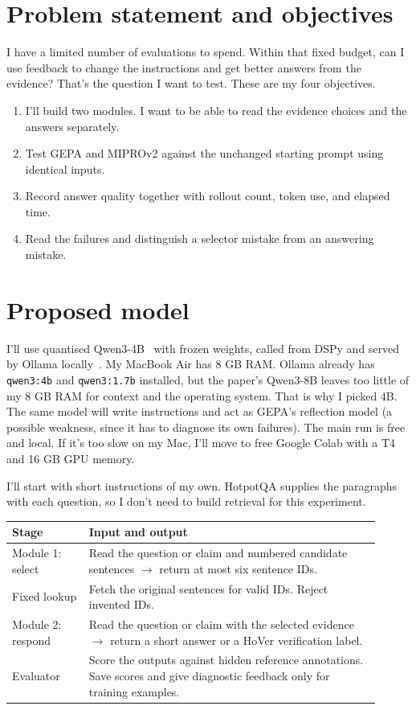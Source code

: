 \documentclass[11pt,a4paper]{article}
\begin{document}
\section{Problem statement and objectives}
I have a limited number of evaluations to spend. Within that fixed budget, can I use feedback to change the instructions and get better answers from the evidence? That's the question I want to test. These are my four objectives.
\begin{enumerate}
\setlength{\itemsep}{0pt}
\setlength{\parskip}{0pt}
\item I'll build two modules. I want to be able to read the evidence choices and the answers separately.
\item Test GEPA and MIPROv2 against the unchanged starting prompt using identical inputs.
\item Record answer quality together with rollout count, token use, and elapsed time.
\item Read the failures and distinguish a selector mistake from an answering mistake.
\end{enumerate}

\section{Proposed model}
I'll use quantised Qwen3-4B~\cite{qwen} with frozen weights, called from DSPy and served by Ollama locally~\cite{ollama}. My MacBook Air has 8 GB RAM. Ollama already has \texttt{qwen3:4b} and \texttt{qwen3:1.7b} installed, but the paper's Qwen3-8B leaves too little of my 8 GB RAM for context and the operating system. That is why I picked 4B. The same model will write instructions and act as GEPA's reflection model (a possible weakness, since it has to diagnose its own failures). The main run is free and local. If it's too slow on my Mac, I'll move to free Google Colab with a T4 and 16 GB GPU memory.

I'll start with short instructions of my own. HotpotQA supplies the paragraphs with each question, so I don't need to build retrieval for this experiment.

\begin{center}
\small
\begin{tabular}{|p{0.19\linewidth}|p{0.72\linewidth}|}
\hline
Stage & Input and output \\ \hline
Module 1: select & Read the question or claim and numbered candidate sentences
$\rightarrow$ return at most six sentence IDs. \\ \hline
Fixed lookup & Fetch the original sentences for valid IDs. Reject invented IDs. \\ \hline
Module 2: respond & Read the question or claim with the selected evidence
$\rightarrow$ return a short answer or a HoVer verification label. \\ \hline
Evaluator & Score the outputs against hidden reference annotations. Save scores
and give diagnostic feedback only for training examples. \\ \hline
\end{tabular}
\end{center}
\end{document}
